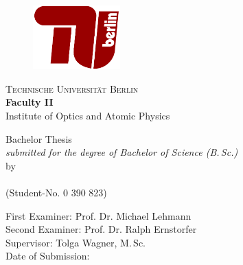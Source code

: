 \begin{titlepage}
	\begin{figure}[H]
	\centering
	\includegraphics[width=0.3\textwidth]{Figures/Logo.pdf}
	\end{figure}
	{\center
	{\LARGE \textsc{Technische Universität Berlin}\\
	\vspace*{10mm}
	\textbf{Faculty II}\\
	Institute of Optics and Atomic Physics}\\
	\vspace*{\fill}

	\hrulefill

	{\Huge \textbf{\thesistitle}\par}

	\hrulefill

	\vspace*{\fill}
	{\LARGE Bachelor Thesis}\\
	\emph{submitted for the degree of Bachelor of Science (B.\,Sc.)}\\
	\vspace*{\fill}
	by\\
	{\Large \textbf{\thesisauthor}}\\
	(Student-No. 0 390 823)\\
	}
	\vspace*{10mm}
	\begin{tabbing}
	\hspace*{4cm}First Examiner: \hspace*{1cm}\=Prof. Dr. Michael Lehmann\\
	\hspace*{4cm}Second Examiner: \>Prof. Dr. Ralph Ernstorfer\\
	\hspace*{4cm}Supervisor: \>Tolga Wagner, M.\,Sc.\\
	\hspace*{4cm}Date of Submission: \>\submissiondate \\
	\end{tabbing}
\end{titlepage}